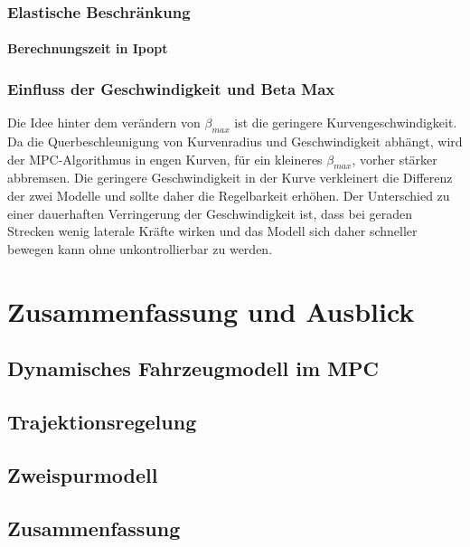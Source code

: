 \documentclass{like}
\begin{document}
\subsection{Elastische Beschränkung}
\subsubsection*{Berechnungszeit in Ipopt}

\subsection{Einfluss der Geschwindigkeit und Beta Max}
Die Idee hinter dem verändern von $\beta_{max}$ ist die geringere Kurvengeschwindigkeit. Da die Querbeschleunigung von Kurvenradius und Geschwindigkeit abhängt, wird der \ac{MPC}-Algorithmus  in engen Kurven, für ein kleineres $\beta_{max}$, vorher stärker abbremsen. Die geringere Geschwindigkeit in der Kurve verkleinert die Differenz der zwei Modelle und sollte daher die Regelbarkeit erhöhen. Der Unterschied zu einer dauerhaften Verringerung der Geschwindigkeit ist, dass bei geraden Strecken wenig laterale Kräfte wirken und das Modell sich daher schneller bewegen kann ohne unkontrollierbar zu werden. 


\chapter[Ausblick]{Zusammenfassung und Ausblick}
\section{Dynamisches Fahrzeugmodell im MPC}
\section{Trajektionsregelung}
\section{Zweispurmodell}
\section{Zusammenfassung}



\appendix





%



%


\end{document}
